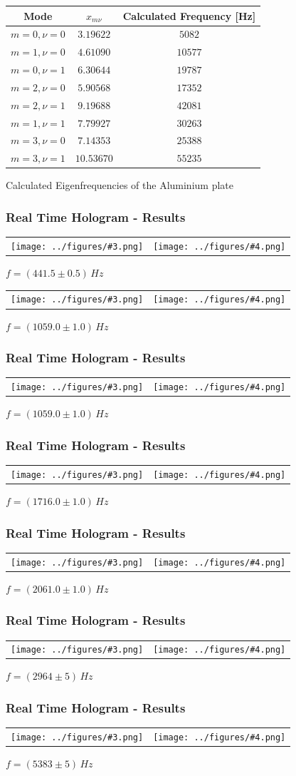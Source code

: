 \documentclass{beamer}
\newcommand{\graTwoOneC}[5]{
	\begin{table}
		\centering
		\begin{tabular}[width=\textwidth]{cc}
			\texttt{[image: ../figures/\#3.png]}&
			\texttt{[image: ../figures/\#4.png]}\\
		\end{tabular}
		#5
	\end{table}
}
\begin{document}
\begin{frame}
	\begin{table}[h]
		\centering
		\begin{tabular}{c|c|c}
			Mode 		& $x_{m\nu}$ & Calculated Frequency [Hz] 	 \\ \hline\hline
			$m=0,\nu=0$	&$3.19622$   &$5082$						\\ \hline
			$m=1,\nu=0$	& $4.61090$  & $10577$					\\ \hline
			$m=0,\nu=1$	& $6.30644$  & $19787$					\\ \hline
			$m=2,\nu=0$	& $5.90568$  & $17352$					\\ \hline
			$m=2,\nu=1$	& $9.19688$  & $42081$					\\ \hline
			$m=1,\nu=1$	& $7.79927$  & $30263$				     \\ \hline
			$m=3,\nu=0$	& $7.14353$  & $25388$                \\ \hline
			$m=3,\nu=1$	& $10.53670$ & $55235$
		\end{tabular} \vskip 0.2cm
		{Calculated Eigenfrequencies of the Aluminium plate}
	\end{table}	
\end{frame}
\begin{frame}
	\frametitle{Real Time Hologram - Results}
	\graTwoOneC{0.4}{0.2}{aluminium2_edit}{aluminium2_lit}{$f=(441.5\pm0.5)\,\si{Hz}$}
	\graTwoOneC{0.4}{0.2}{aluminium3_edit}{aluminium3_lit}{$f=(1059.0\pm1.0)\,\si{Hz}$}
\end{frame}
\begin{frame}
	\frametitle{Real Time Hologram - Results}
	\graTwoOneC{0.65}{0.34}{aluminium3_edit}{aluminium3_lit}{$f=(1059.0\pm1.0)\,\si{Hz}$}
\end{frame}
\begin{frame}
	\frametitle{Real Time Hologram - Results}
	\graTwoOneC{0.65}{0.34}{aluminium6_edit}{aluminium6_lit}{$f=(1716.0\pm1.0)\,\si{Hz}$}
\end{frame}
\begin{frame}
	\frametitle{Real Time Hologram - Results}
	\graTwoOneC{0.65}{0.34}{aluminium7_edit}{aluminium7_lit}{$f=(2061.0\pm1.0)\,\si{Hz}$}
\end{frame}
\begin{frame}
	\frametitle{Real Time Hologram - Results}
	\graTwoOneC{0.65}{0.34}{aluminium9_edit}{aluminium9_lit}{$f=(2964\pm5)\,\si{Hz}$}
\end{frame}
\begin{frame}
	\frametitle{Real Time Hologram - Results}
	\graTwoOneC{0.65}{0.34}{aluminium10_edit}{aluminium10_lit}{$f=(5383\pm5)\,\si{Hz}$}
\end{frame}
\end{document}
